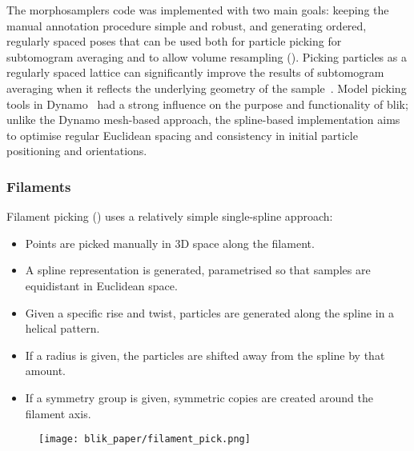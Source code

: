 The morphosamplers code was implemented with two main goals: keeping the manual annotation procedure simple and robust, and generating ordered, regularly spaced poses that can be used both for particle picking for subtomogram averaging and to allow volume resampling (). Picking particles as a regularly spaced lattice can significantly improve the results of subtomogram averaging when it reflects the underlying geometry of the sample~\cite{castano-diezDynamoCatalogueGeometrical2017,burtFlexibleFrameworkMultiparticle2021}. Model picking tools in Dynamo~\cite{castano-diezDynamoFlexibleUserfriendly2012} had a strong influence on the purpose and functionality of blik; unlike the Dynamo mesh-based approach, the spline-based implementation aims to optimise regular Euclidean spacing and consistency in initial particle positioning and orientations.

\subsubsection{Filaments}
Filament picking () uses a relatively simple single-spline approach:

\begin{itemize}[noitemsep]
    \item Points are picked manually in 3D space along the filament.
    \item A spline representation is generated, parametrised so that samples are equidistant in Euclidean space.
    \item Given a specific rise and twist, particles are generated along the spline in a helical pattern.
    \item If a radius is given, the particles are shifted away from the spline by that amount.
    \item If a symmetry group is given, symmetric copies are created around the filament axis.
\end{itemize}

\begin{figure}[!ht]
    \centering
    \texttt{[image: blik\_paper/filament\_pick.png]}
    \label{filament-pick}
\end{figure}


